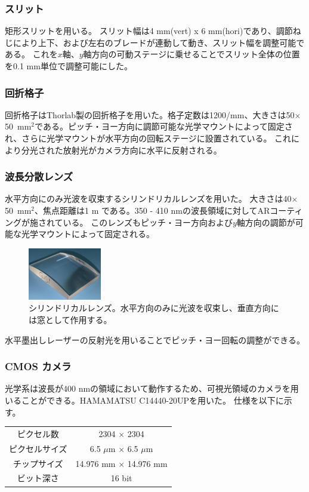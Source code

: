 \documentclass[a4paper,11pt,uplatex]{jsbook}
\begin{document}
\subsubsection{スリット}
矩形スリットを用いる。
スリット幅は4 mm(vert) x 6 mm(hori)であり、調節ねじにより上下、および左右のブレードが連動して動き、スリット幅を調整可能である。
これを$x$軸、$y$軸方向の可動ステージに乗せることでスリット全体の位置を0.1 mm単位で調整可能にした。

\subsubsection{回折格子}
回折格子はThorlab製の回折格子\cite{grating}を用いた。格子定数は1200/mm、大きさは50$\times$50~mm$^2$である。ピッチ・ヨー方向に調節可能な光学マウントによって固定され、さらに光学マウントが水平方向の回転ステージに設置されている。
これにより分光された放射光がカメラ方向に水平に反射される。

\subsubsection{波長分散レンズ}
水平方向にのみ光波を収束するシリンドリカルレンズを用いた。
大きさは40$\times$50~mm$^2$、焦点距離は1 m である。350 - 410 nmの波長領域に対してARコーティングが施されている。
このレンズもピッチ・ヨー方向および$y$軸方向の調節が可能な光学マウントによって固定される。
\begin{figure}[tb]
  \centering
  \includegraphics[width=0.4\linewidth]{image/3-lens.png}
  \caption[シリンドリカルレンズ]{シリンドリカルレンズ。水平方向のみに光波を収束し、垂直方向には窓として作用する。}
  \label{lens}
\end{figure}
水平墨出しレーザーの反射光を用いることでピッチ・ヨー回転の調整ができる。

\subsubsection{CMOS カメラ}
光学系は波長が400 nmの領域において動作するため、可視光領域のカメラを用いることができる。HAMAMATSU C14440-20UPを用いた。
仕様を以下に示す。
\begin{table}[h]
\centering
\begin{tabular}{c|c}
  ピクセル数 & 2304 $\times$ 2304\\
  ピクセルサイズ & 6.5 $\mu$m $\times$ 6.5 $\mu$m\\
  チップサイズ & 14.976 mm $\times$ 14.976 mm\\
  ビット深さ & 16 bit\\ 
\end{tabular}
\end{table}
\end{document}

